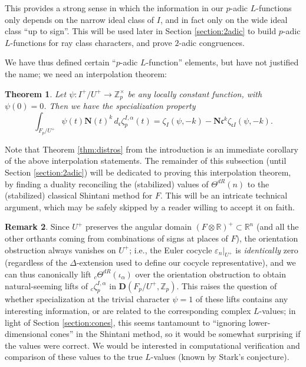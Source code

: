 \documentclass[10pt]{amsart}
\newtheorem{thm}{Theorem}[section]
\theoremstyle{definition}
\newtheorem{rem}[thm]{Remark}
\newcommand{\Z}{\mathbb{Z}}
\newcommand{\R}{\mathbb{R}}
\renewcommand{\c}{\mathfrak{c}}
\newcommand{\D}{\mathbf{D}}
\numberwithin{equation}{section}
\begin{document}
    This provides a strong sense in which the information in our $p$-adic $L$-functions only depends on the narrow ideal class of $I$, and in fact only on the wide ideal class ``up to sign''. This will be used later in Section \ref{section:2adic} to build $p$-adic $L$-functions for ray class characters, and prove $2$-adic congruences.
    
    We have thus defined certain ``$p$-adic $L$-function'' elements, but have not justified the name; we need an interpolation theorem:

    \begin{thm} \label{thm:interp}
        Let $\psi:I^+/U^+\to \Z_p^\times$ be any locally constant function, with $\psi(0)=0$. Then we have the specialization property
        \[
        \int_{F_p/U^+} \psi(t)\mathbf{N}(t)^k\, d{}_\c\zeta_p^{I,\alpha}(t)=\zeta_{I}(\psi, -k)-\mathbf{N}\c^{k}\zeta_{\c I}(\psi, -k).
        \]
    \end{thm}

    Note that Theorem \ref{thm:distros} from the introduction is an immediate corollary of the above interpolation statements. The remainder of this subsection (until Section \ref{section:2adic}) will be dedicated to proving this interpolation theorem, by finding a duality reconciling the (stabilized) values of $\Theta^{dR}(n)$ to the (stabilized) classical Shintani method for $F$. This will be an intricate technical argument, which may be safely skipped by a reader willing to accept it on faith.

    \begin{rem} \label{rem:comparison}
        Since $U^+$ preserves the angular domain $(F\otimes \R)^+\subset \R^n$ (and all the other orthants coming from combinations of signs at places of $F$), the orientation obstruction always vanishes on $U^+$; i.e., the Euler cocycle $\varepsilon_n|_{U^+}$ is \emph{identically} zero (regardless of the $\Delta$-extension used to define our cocycle representative), and we can thus canonically lift ${}_c\Theta^{dR}(\iota_\alpha)$ over the orientation obstruction to obtain natural-seeming lifts of ${}_c\zeta_p^{I,\alpha}$ in $\D(F_p/U^+, \Z_p)$. This raises the question of whether specialization at the trivial character $\psi = 1$ of these lifts contains any interesting information, or are related to the corresponding complex $L$-values; in light of Section \ref{section:cones}, this seems tantamount to ``ignoring lower-dimensional cones'' in the Shintani method, so it would be somewhat surprising if the values were correct. We would be interested in computational verification and comparison of these values to the true $L$-values (known by Stark's conjecture).
    \end{rem}
    
\end{document}
